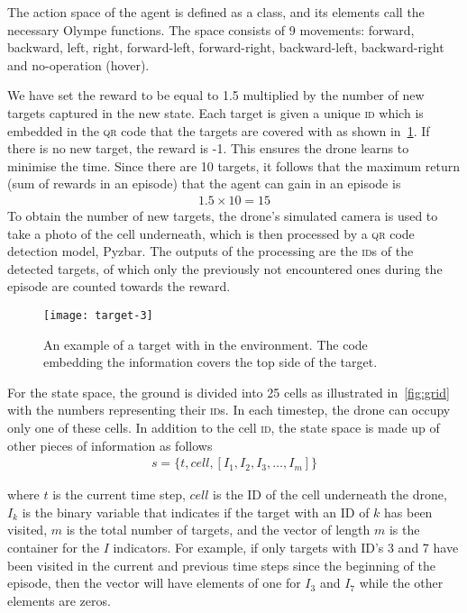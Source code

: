 \documentclass[../main.tex]{subfiles}
\begin{document}
The action space of the agent is defined as a class, and its
elements call the necessary Olympe functions. 
The space consists of 9 movements: 
forward, backward, left,
right, forward-left, forward-right, backward-left,
backward-right and no-operation (hover).

We have set the reward to be equal to 1.5 multiplied by 
the number of new targets captured in the new state.
Each target is given a unique \textsc{id} which 
is embedded in the \textsc{qr} code that the targets are covered with
as shown in~\cref{fig:target}.
If there is no new target, the reward is -1. 
This ensures the drone learns to
minimise the time.
Since there are 10 targets, it follows that the maximum
return (sum of rewards in an episode) that the agent can gain  
in an episode is 
\begin{align}
        1.5 \times 10 = 15
\end{align}
To obtain the number of new targets, the drone's simulated camera is
used to take a photo of the cell
underneath, which is then processed by a \textsc{qr} code detection 
model, Pyzbar. 
The outputs of the processing are the \textsc{id}s of 
the detected targets, 
of which only the previously not encountered ones during 
the episode are counted towards the reward.

\begin{figure}[tbp]
	\centering
	\texttt{[image: target-3]}
        \caption{An example of a target with  in the environment.
        The \qr code embedding the \id information covers the top side
        of the target.}
	\label{fig:target}
\end{figure}

For the state space, the ground is divided into 25 cells as
illustrated in~\cref{fig:grid} with the numbers representing their
\textsc{id}s. 
In each timestep, the drone can occupy only one of these cells.
In addition to the cell \textsc{id}, the state space is made up of
other pieces of information as follows
\begin{align}
	s = \{ t, cell, [ I_1, I_2, I_3, \ldots, I_m] \} 
	\label{eq:state-space}
\end{align}

\noindent 
where $t$ is the current time step, $cell$ is the ID of the
cell underneath the drone, $I_k$ is the binary variable 
that indicates if the target with an ID of $k$ has been
visited, $m$ is the total number of targets,
and the vector of length $m$ is the container for the
$I$ indicators. 
For example,
if only targets with ID's 3 and 7 have been visited
in the current and previous time steps since the beginning of the 
episode,
then the vector will have elements of one for $I_3$ and $I_7$ while
the other elements are zeros.
\end{document}
